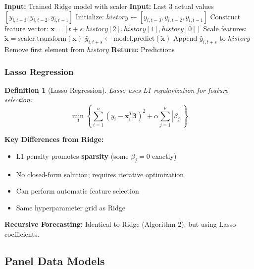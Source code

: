 \documentclass[12pt,a4paper]{article}
\newtheorem{definition}{Definition}[section]
\begin{document}
\begin{algorithm}[H]
\caption{Ridge Recursive Multi-Step Forecasting}
\begin{algorithmic}[1]
\State \textbf{Input:} Trained Ridge model with scaler
\State \textbf{Input:} Last 3 actual values $[y_{i,t-3}, y_{i,t-2}, y_{i,t-1}]$
\State Initialize: $history \gets [y_{i,t-3}, y_{i,t-2}, y_{i,t-1}]$
    \State Construct feature vector: $\mathbf{x} = [t+s, history[2], history[1], history[0]]$
    \State Scale features: $\tilde{\mathbf{x}} = \text{scaler.transform}(\mathbf{x})$
    \State $\hat{y}_{i,t+s} \gets \text{model.predict}(\tilde{\mathbf{x}})$
    \State Append $\hat{y}_{i,t+s}$ to $history$
    \State Remove first element from $history$
\EndFor
\State \textbf{Return:} Predictions
\end{algorithmic}
\end{algorithm}

\subsubsection{Lasso Regression}

\begin{definition}[Lasso Regression]
Lasso uses L1 regularization for feature selection:
\begin{equation}
\min_{\boldsymbol{\beta}} \left\{ \sum_{i=1}^{n}(y_i - \mathbf{x}_i^T\boldsymbol{\beta})^2 + \alpha \sum_{j=1}^{p}|\beta_j| \right\}
\end{equation}
\end{definition}

\textbf{Key Differences from Ridge:}
\begin{itemize}
    \item L1 penalty promotes \textbf{sparsity} (some $\beta_j = 0$ exactly)
    \item No closed-form solution; requires iterative optimization
    \item Can perform automatic feature selection
    \item Same hyperparameter grid as Ridge
\end{itemize}

\textbf{Recursive Forecasting:}
Identical to Ridge (Algorithm 2), but using Lasso coefficients.

\subsection{Panel Data Models}
\end{document}
